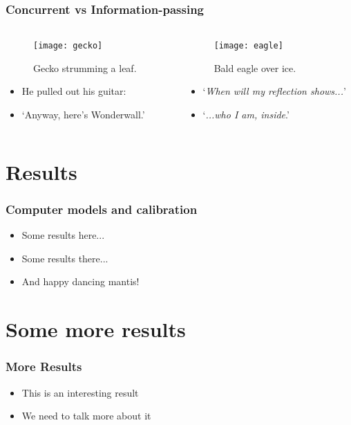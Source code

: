 \documentclass[10pt,xcolor=table]{beamer}
\begin{document}
\begin{frame}
  \frametitle{Concurrent vs Information-passing}
  \begin{columns}
    \begin{column}{0.5\textwidth}
      \begin{figure}
        \texttt{[image: gecko]}
        \caption{Gecko strumming a leaf\footnotemark[2].}
      \end{figure}
      \begin{itemize}
      \item He pulled out his guitar:
      \item `Anyway, here's Wonderwall.'
      \end{itemize}
    \end{column}
    \begin{column}{0.5\textwidth}
      \begin{figure}
        \texttt{[image: eagle]}
        \caption{Bald eagle over ice\footnotemark[3].}
      \end{figure}
      \begin{itemize}
      \item `\textit{When will my reflection shows...}'
      \item `\textit{...who I am, inside}.'
      \end{itemize}      
    \end{column}    
  \end{columns}
  \vspace{0.25cm}
\end{frame}


\section{Results}
\begin{frame}
  \frametitle{Computer models and calibration}
  \begin{itemize}
  \item Some results here...
  \item Some results there...
  \item And happy dancing mantis!
  \end{itemize}  
\end{frame}

\section{Some more results}
\begin{frame}
  \frametitle{More Results}
  \begin{itemize}
  \item This is an interesting result
  \item We need to talk more about it
  \end{itemize}
\end{frame}
\end{document}
